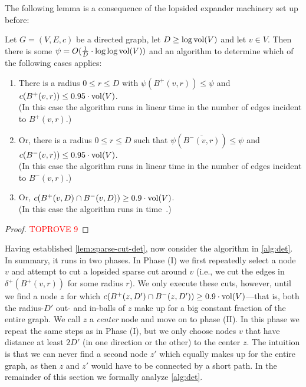 \documentclass[letterpaper,11pt]{article}
\begin{document}
The following lemma is a consequence of the lopsided expander machinery set up before:

\begin{lemma} \label{lem:sparse-cut-det}
Let $G = (V, E, c)$ be a directed graph, let $D \geq \log \operatorname{vol}(V)$ and let $v \in V$. Then there is some $\psi = O(\frac{1}{D} \cdot \log\log \operatorname{vol}(V))$ and an algorithm to determine which of the following cases applies:
\begin{enumerate}[label=(\roman*)]
	\item There is a radius $0 \leq r \leq D$ with $\psi(B^+(v, r)) \leq \psi$ and $c(B^+(v, r)) \leq 0.95 \cdot \operatorname{vol}(V)$.\\(In this case the algorithm runs in linear time in the number of edges incident to $B^+(v, r)$.)
	\item Or, there is a radius $0 \leq r \leq D$ such that $\psi(\overline{B^-(v, r)}) \leq \psi$ and $c(B^-(v, r)) \leq 0.95 \cdot \operatorname{vol}(V)$.\\(In this case the algorithm runs in linear time in the number of edges incident to $B^-(v, r)$.)
	\item Or, $c(B^+(v, D) \cap B^-(v, D)) \geq 0.9 \cdot \operatorname{vol}(V)$.\\(In this case the algorithm runs in time~.)
\end{enumerate}
\end{lemma}
\begin{proof}\textcolor{red}{TOPROVE 9}\end{proof}

Having established \cref{lem:sparse-cut-det}, now consider the algorithm in \cref{alg:det}. In summary, it runs in two phases. In Phase (I) we first repeatedly select a node $v$ and attempt to cut a lopsided sparse cut around $v$ (i.e., we cut the edges in $\delta^+(B^+(v, r))$ for some radius $r$). We only execute these cuts, however, until we find a node $z$ for which $c(B^+(z, D') \cap B^-(z, D')) \geq 0.9 \cdot \operatorname{vol}(V)$---that is, both the radius-$D'$ out- and in-balls of $z$ make up for a big constant fraction of the entire graph. We call $z$ a \emph{center} node and move on to phase (II). In this phase we repeat the same steps as in Phase (I), but we only choose nodes $v$ that have distance at least $2D'$ (in one direction or the other) to the center $z$. The intuition is that we can never find a second node $z'$ which equally makes up for the entire graph, as then $z$ and $z'$ would have to be connected by a short path. In the remainder of this section we formally analyze \cref{alg:det}.
\end{document}
